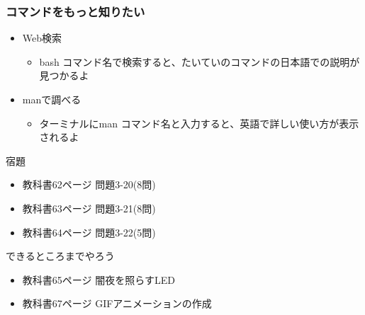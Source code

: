 \begin{frame}
    \frametitle{コマンドをもっと知りたい}
    \begin{itemize}
        \item Web検索
        \begin{itemize}
            \item bash コマンド名で検索すると、たいていのコマンドの日本語での説明が見つかるよ
        \end{itemize}
        \item manで調べる
        \begin{itemize}
            \item ターミナルにman コマンド名と入力すると、英語で詳しい使い方が表示されるよ
        \end{itemize}
    \end{itemize}
\end{frame}

\begin{frame}
    \begin{exampleblock}{宿題}
        \begin{itemize}
            \item 教科書62ページ 問題3-20(8問)
            \item 教科書63ページ 問題3-21(8問)
            \item 教科書64ページ 問題3-22(5問)
            \end{itemize}
    \end{exampleblock} 
    \begin{block}{できるところまでやろう}
        \begin{itemize}
            \item 教科書65ページ 闇夜を照らすLED
            \item 教科書67ページ GIFアニメーションの作成
        \end{itemize}
    \end{block} 
\end{frame}